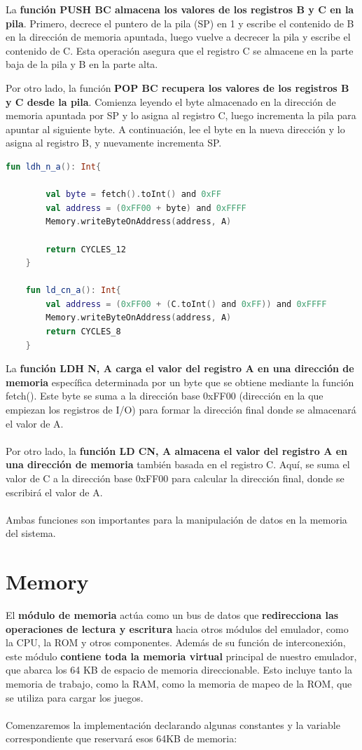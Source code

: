 La \textbf{función PUSH BC almacena los valores de los registros B y C en la pila}. Primero, decrece el puntero de la pila (SP) en 1 y escribe el contenido de B en la dirección de memoria apuntada, luego vuelve a decrecer la pila y escribe el contenido de C. Esta operación asegura que el registro C se almacene en la parte baja de la pila y B en la parte alta.

Por otro lado, la función \textbf{POP BC recupera los valores de los registros B y C desde la pila}. Comienza leyendo el byte almacenado en la dirección de memoria apuntada por SP y lo asigna al registro C, luego incrementa la pila para apuntar al siguiente byte. A continuación, lee el byte en la nueva dirección y lo asigna al registro B, y nuevamente incrementa SP.

\begin{lstlisting}[language=Kotlin, caption={Operaciones I/O}, label={code:kotlinio}]
    fun ldh_n_a(): Int{

        val byte = fetch().toInt() and 0xFF
        val address = (0xFF00 + byte) and 0xFFFF
        Memory.writeByteOnAddress(address, A)

        return CYCLES_12
    }

    fun ld_cn_a(): Int{
        val address = (0xFF00 + (C.toInt() and 0xFF)) and 0xFFFF
        Memory.writeByteOnAddress(address, A)
        return CYCLES_8
    }
\end{lstlisting}

La \textbf{función LDH N, A carga el valor del registro A en una dirección de memoria} específica determinada por un byte que se obtiene mediante la función fetch(). Este byte se suma a la dirección base 0xFF00 (dirección en la que empiezan los registros de I/O) para formar la dirección final donde se almacenará el valor de A.
\\\\
Por otro lado, la \textbf{función LD CN, A almacena el valor del registro A en una dirección de memoria} también basada en el registro C. Aquí, se suma el valor de C a la dirección base 0xFF00 para calcular la dirección final, donde se escribirá el valor de A.
\\\\
Ambas funciones son importantes para la manipulación de datos en la memoria del sistema.

\section{Memory}
El \textbf{módulo de memoria} actúa como un bus de datos que \textbf{redirecciona las operaciones de lectura y escritura} hacia otros módulos del emulador, como la CPU, la ROM y otros componentes. Además de su función de interconexión, este módulo \textbf{contiene toda la memoria virtual} principal de nuestro emulador, que abarca los 64 KB de espacio de memoria direccionable. Esto incluye tanto la memoria de trabajo, como la RAM, como la memoria de mapeo de la ROM, que se utiliza para cargar los juegos.
\\\\
Comenzaremos la implementación declarando algunas constantes y la variable correspondiente que reservará esos 64KB de memoria:

